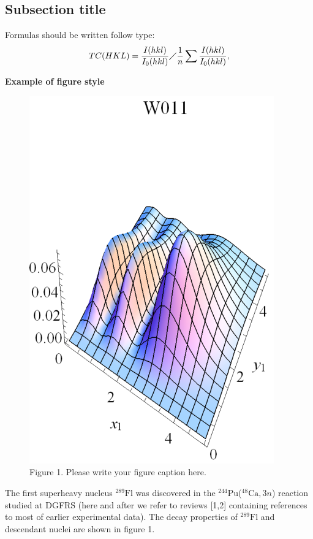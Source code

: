 \documentclass[12pt,a4paper,twoside]{article}
\begin{document}
\subsection*{Subsection title}

Formulas should be written follow type:
\begin{equation}
TC(HKL)= \frac{I(hkl)}{I_0(hkl)}\diagup\frac{1}{n}\sum{\frac{I(hkl)}{I_0(hkl)}},\label{}
\end{equation}

\begin{flushleft}
\textbf{Example of figure style}
\end{flushleft}

\begin{figure}[h!]
\centering
\includegraphics[scale=0.8]{W1_1.eps}\\
\scriptsize{ Figure 1. Please write your figure caption here.}
\label{fig:image1}
\end{figure}

The first superheavy nucleus $^{289}\text{Fl}$ was discovered in the $^{244}$Pu($^{48}\text{Ca},3n$) reaction studied at DGFRS (here and after we refer to reviews [1,2] containing references to most of earlier experimental data). The decay properties of $^{289}\text{Fl}$ and descendant nuclei are shown in figure 1.
\end{document}
